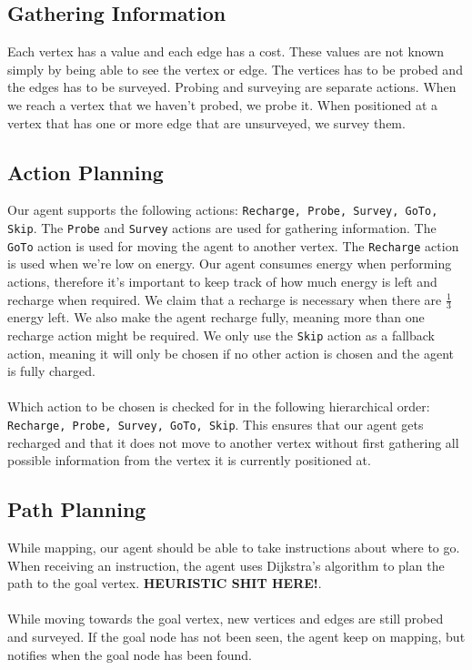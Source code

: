 \documentclass[11pt]{report}
\begin{document}
\subsection*{Gathering Information}
Each vertex has a value and each edge has a cost. These values are not known simply  by being able to see the vertex or edge. The vertices has to be probed and the edges has to be surveyed. Probing and surveying are separate actions. When we reach a vertex that we haven't probed, we probe it. When positioned at a vertex that has one or more edge that are unsurveyed, we survey them.

\subsection*{Action Planning}
Our agent supports the following actions: {\tt Recharge, Probe, Survey, GoTo, Skip}. The {\tt Probe} and {\tt Survey} actions are used for gathering information. The {\tt GoTo} action is used for moving the agent to another vertex. The {\tt Recharge} action is used when we're low on energy. Our agent consumes energy when performing actions, therefore it's important to keep track of how much energy is left and recharge when required. We claim that a recharge is necessary when there are $\frac{1}{3}$ energy left. We also make the agent recharge fully, meaning more than one recharge action might be required. We only use the {\tt Skip} action as a fallback action, meaning it will only be chosen if no other action is chosen and the agent is fully charged.\\
\\
Which action to be chosen is checked for in the following hierarchical order: {\tt Recharge, Probe, Survey, GoTo, Skip}. This ensures that our agent gets recharged and that it does not move to another vertex without first gathering all possible information from the vertex it is currently positioned at.

\subsection*{Path Planning}
While mapping, our agent should be able to take instructions about where to go. When receiving an instruction, the agent uses Dijkstra's algorithm to plan the path to the goal vertex. \textbf{HEURISTIC SHIT HERE!}.\\
\\
While moving towards the goal vertex, new vertices and edges are still probed and surveyed. If the goal node has not been seen, the agent keep on mapping, but notifies when the goal node has been found.
\end{document}

